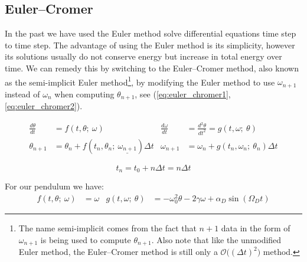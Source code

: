 \documentclass[notitlepage,aps,prd,nofootinbib]{revtex4-1}
\DeclareRobustCommand{\orderof}{\ensuremath{\mathcal{O}}}
\begin{document}
\subsection{Euler--Cromer}
\label{subsec:eulercromer}
In the past we have used the Euler method solve differential equations time step to time step. The advantage of using the Euler method is its simplicity, however its solutions usually do not conserve energy but increase in total energy over time. We can remedy this by switching to the Euler--Cromer method, also known as the semi-implicit Euler method\footnote{The name semi-implicit comes from the fact that $n+1$ data in the form of $\omega_{n+1}$ is being used to compute $\theta_{n+1}$. Also note that like the unmodified Euler method, the Euler--Cromer method is still only a $\orderof\big(\left(\Delta t\right)^2\big)$ method.}, by modifying the Euler method to use $\omega_{n+1}$ instead of $\omega_{n}$ when computing $\theta_{n+1}$, see (\ref{eq:euler_chromer1}, \ref{eq:euler_chromer2}).

\begin{align}
\frac{d \theta}{d t} &= f\left(t, \theta;~\omega\right) &
\frac{d \omega}{d t} &= \frac{d^2 \theta}{d t^2} = g\left(t, \omega;~\theta\right) \label{eq:euler_chromer1} \\
\theta_{n+1} &= \theta_{n} + f\left(t_{n}, \theta_{n};~\underline{\omega_{n+1}}\right) \Delta t & 
\omega_{n+1} &= \omega_{n} + g\left(t_{n}, \omega_{n};~\theta_{n}\right) \Delta t \label{eq:euler_chromer2}
\end{align}

\begin{equation} \label{eq:tn} 
t_{n} = t_{0} + n \Delta t = n \Delta t
\end{equation}

For our pendulum we have:
\begin{align} \label{eq:f_g_applied}
f\left(t, \theta;~\omega\right) &=  \omega &
g\left(t, \omega;~\theta\right) &= -\omega_{0}^2 \theta - 2\gamma \omega + \alpha_{D}\sin\left(\Omega_{D} t\right)
\end{align}
\end{document}
